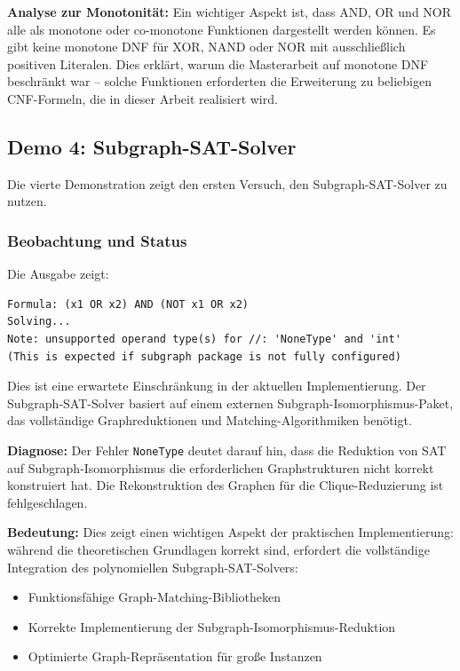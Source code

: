 ﻿\documentclass[a4paper,12pt]{article}
\theoremstyle{definition}
\begin{document}
\textbf{Analyse zur Monotonität:} Ein wichtiger Aspekt ist, dass AND, OR und NOR alle als monotone oder co-monotone Funktionen dargestellt werden können. Es gibt keine monotone DNF für XOR, NAND oder NOR mit ausschließlich positiven Literalen. Dies erklärt, warum die Masterarbeit \cite{Epp13} auf monotone DNF beschränkt war -- solche Funktionen erforderten die Erweiterung zu beliebigen CNF-Formeln, die in dieser Arbeit realisiert wird.

\subsection{Demo 4: Subgraph-SAT-Solver}

Die vierte Demonstration zeigt den ersten Versuch, den Subgraph-SAT-Solver zu nutzen.

\subsubsection{Beobachtung und Status}

Die Ausgabe zeigt:
\begin{lstlisting}
Formula: (x1 OR x2) AND (NOT x1 OR x2)
Solving...
Note: unsupported operand type(s) for //: 'NoneType' and 'int'
(This is expected if subgraph package is not fully configured)
\end{lstlisting}

Dies ist eine erwartete Einschränkung in der aktuellen Implementierung. Der Subgraph-SAT-Solver basiert auf einem externen Subgraph-Isomorphismus-Paket, das vollständige Graphreduktionen und Matching-Algorithmiken benötigt. 

\textbf{Diagnose:} Der Fehler \texttt{NoneType} deutet darauf hin, dass die Reduktion von SAT auf Subgraph-Isomorphismus die erforderlichen Graphstrukturen nicht korrekt konstruiert hat. Die Rekonstruktion des Graphen für die Clique-Reduzierung ist fehlgeschlagen.

\textbf{Bedeutung:} Dies zeigt einen wichtigen Aspekt der praktischen Implementierung: während die theoretischen Grundlagen korrekt sind, erfordert die vollständige Integration des polynomiellen Subgraph-SAT-Solvers:
\begin{itemize}
    \item Funktionsfähige Graph-Matching-Bibliotheken
    \item Korrekte Implementierung der Subgraph-Isomorphismus-Reduktion
    \item Optimierte Graph-Repräsentation für große Instanzen
\end{itemize}
\end{document}
